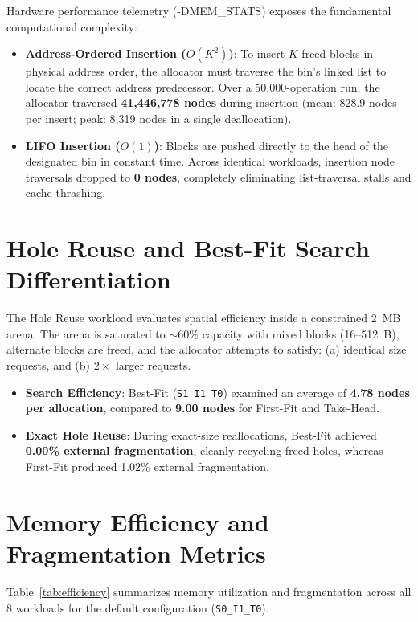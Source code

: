 \documentclass[a4paper,11pt]{report}
\begin{document}
Hardware performance telemetry (-DMEM\_STATS) exposes the fundamental computational complexity:
\begin{itemize}
    \item \textbf{Address-Ordered Insertion ($O(K^2)$)}: To insert $K$ freed blocks in physical address order, the allocator must traverse the bin's linked list to locate the correct address predecessor. Over a 50,000-operation run, the allocator traversed \textbf{41,446,778 nodes} during insertion (mean: 828.9 nodes per insert; peak: 8,319 nodes in a single deallocation).
    \item \textbf{LIFO Insertion ($O(1)$)}: Blocks are pushed directly to the head of the designated bin in constant time. Across identical workloads, insertion node traversals dropped to \textbf{0 nodes}, completely eliminating list-traversal stalls and cache thrashing.
\end{itemize}

\section{Hole Reuse and Best-Fit Search Differentiation}
The Hole Reuse workload evaluates spatial efficiency inside a constrained 2~MB arena. The arena is saturated to $\sim 60\%$ capacity with mixed blocks (16--512~B), alternate blocks are freed, and the allocator attempts to satisfy: (a) identical size requests, and (b) $2\times$ larger requests.
\begin{itemize}
    \item \textbf{Search Efficiency}: Best-Fit (\texttt{S1\_I1\_T0}) examined an average of \textbf{4.78 nodes per allocation}, compared to \textbf{9.00 nodes} for First-Fit and Take-Head.
    \item \textbf{Exact Hole Reuse}: During exact-size reallocations, Best-Fit achieved \textbf{0.00\% external fragmentation}, cleanly recycling freed holes, whereas First-Fit produced 1.02\% external fragmentation.
\end{itemize}

\section{Memory Efficiency and Fragmentation Metrics}
Table~\ref{tab:efficiency} summarizes memory utilization and fragmentation across all 8 workloads for the default configuration (\texttt{S0\_I1\_T0}).
\end{document}
